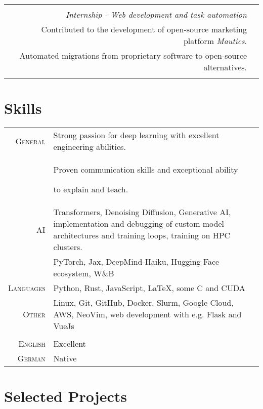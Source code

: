 \documentclass[11pt]{article}
\newcommand{\tabitem}{{\textbullet}~}
\begin{document}
\begin{tabular}{r|l}
    \begin{tabularx}{0.8\textwidth}{X}
        \textsc{Padberg \& Partners} \\

        \emph{Internship - Web development and task automation} \\

        \tabitem Contributed to the development of open-source marketing
        platform \textit{Mautics}. \\
        \tabitem Automated migrations from proprietary software to open-source
        alternatives. \\

    \end{tabularx}

\end{tabular}

\section{Skills}

\begin{tabularx}{\textwidth}{rX}
    \textsc{General} & Strong passion for deep learning with excellent
    engineering abilities. \\
    & Proven communication skills and exceptional ability

    to explain and teach. \\
    \textsc{AI} & Transformers, Denoising Diffusion,
                   Generative AI, implementation and debugging of
                   custom model architectures and training loops,
                   training on HPC clusters. \\
                 & PyTorch, Jax, DeepMind-Haiku, Hugging Face ecosystem, W\&B \\
    \textsc{Languages} & Python, Rust, JavaScript, LaTeX, some C and CUDA \\
    \textsc{Other} & Linux, Git, GitHub, Docker, Slurm, Google Cloud, AWS,
    NeoVim, web development with e.g. Flask and VueJs \\

    \multicolumn{2}{c}{} \\

    \textsc{English} & Excellent \\
    \textsc{German}  & Native \\

\end{tabularx}

\section{Selected Projects}
\end{document}
